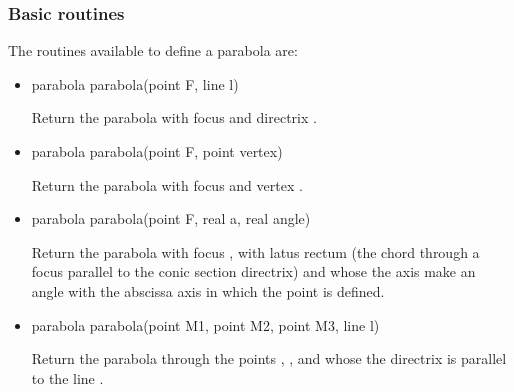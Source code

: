 \documentclass[pdftex]{article}
\begin{document}
\subsubsection{Basic routines}
The routines available to define a parabola are:
\begin{itemize}
\item {}
  \begin{Vcolor}
    parabola parabola(point F, line l)
  \end{Vcolor}
  Return the parabola with focus  and directrix .
\item {}
  \begin{Vcolor}
    parabola parabola(point F, point vertex)
  \end{Vcolor}
  Return the parabola with focus  and vertex .
\item {}
  \begin{Vcolor}
    parabola parabola(point F, real a, real angle)
  \end{Vcolor}
  Return the parabola with focus , with latus
  rectum  (the chord through a focus parallel to the conic
  section directrix) and whose the axis make an angle 
  with the abscissa axis in which the point  is defined.
\item {}
  \begin{Vcolor}
    parabola parabola(point M1, point M2, point M3, line l)
  \end{Vcolor}
  Return the parabola through the
  points , ,  and whose the directrix is
  parallel to the line .
\end{itemize}
\end{document}

